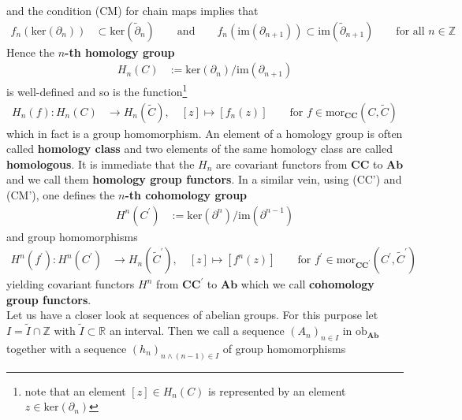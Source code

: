 and the condition (CM) for chain maps implies that
\begin{align*}
  f_{n}
  \left(
    \mathrm{ker}(\partial_{n})
  \right)
  &\subset
  \mathrm{ker}(\tilde{\partial}_{n})
  \qquad
  \text{and}
  \qquad
  f_{n}
  \left(
    \mathrm{im}(\partial_{n+1})
  \right)
  \subset
  \mathrm{im}(\tilde{\partial}_{n+1})
  \qquad
  \text{for all }
  n
  \in
  \mathbb{Z}
\end{align*}
Hence the \textbf{$n$-th homology group}
\begin{align*}
  H_{n}(C)
  &:=
  \mathrm{ker}(\partial_{n})
  /
  \mathrm{im}(\partial_{n+1})
\end{align*}
is well-defined and so is the function\footnote{note that an element $[z] \in H_{n}(C)$ is represented by an element $z \in \mathrm{ker}(\partial_{n})$}
\begin{align*}
  H_{n}(f)
  \colon
  H_{n}(C)
  &\to
  H_{n}(\tilde{C})
  ,\quad
  [z]
  \mapsto
  [f_{n}(z)]
  \qquad
  \text{for }
  f
  \in
  \mathrm{mor}_{\mathbf{CC}}
  \left(
    C
    ,
    \tilde{C}
  \right)
\end{align*}
which in fact is a group homomorphism. An element of a homology group is often called \textbf{homology class} and two elements of the same homology class are called \textbf{homologous}. It is immediate that the $H_{n}$ are covariant functors from $\mathbf{CC}$ to $\mathbf{Ab}$ and we call them \textbf{homology group functors}. In a similar vein, using (CC') and (CM'), one defines the \textbf{$n$-th cohomology group}
\begin{align*}
  H^{n}(C^{\prime})
  &:=
  \mathrm{ker}(\partial^{n})
  /
  \mathrm{im}(\partial^{n-1})
\end{align*}
and group homomorphisms
\begin{align*}
  H^{n}(f^{\prime})
  \colon
  H^{n}(C^{\prime})
  &\to
  H_{n}(\tilde{C}^{\prime})
  ,\quad
  [z]
  \mapsto
  [f^{n}(z)]
  \qquad
  \text{for }
  f^{\prime}
  \in
  \mathrm{mor}_{\mathbf{CC^{\prime}}}
  \left(
    C^{\prime}
    ,
    \tilde{C}^{\prime}
  \right)
\end{align*}
yielding covariant functors $H^{n}$ from $\mathbf{CC^{\prime}}$ to $\mathbf{Ab}$ which we call \textbf{cohomology group functors}.
\\
Let us have a closer look at sequences of abelian groups. For this purpose let $I = \tilde{I} \cap \mathbb{Z}$ with $\tilde{I} \subset \mathbb{R}$ an interval. Then we call a sequence $(A_{n})_{n \in I}$ in $\mathrm{ob}_{\mathbf{Ab}}$ together with a sequence $(h_{n})_{n \land (n-1) \in I}$ of group homomorphisms
